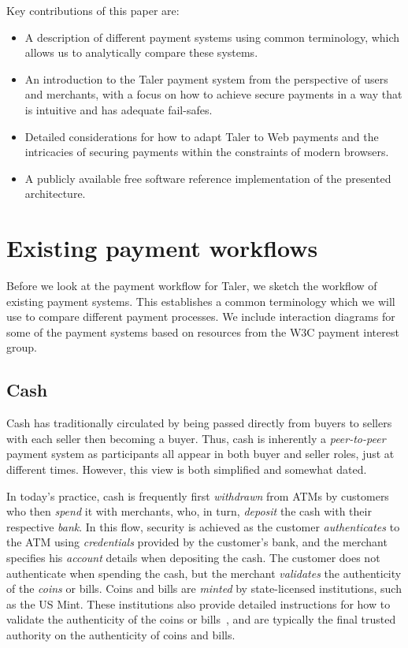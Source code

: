 \documentclass{llncs}
\begin{document}
Key contributions of this paper are:
\begin{itemize}
 \item A description of different payment systems using
  common terminology, which allows us to analytically compare
  these systems.
 \item An introduction to the Taler payment system from the
  perspective of users and merchants, with a focus on how
  to achieve secure payments in a way that is intuitive and
  has adequate fail-safes.
 \item Detailed considerations for how to adapt Taler to
  Web payments and the intricacies of securing payments
  within the constraints of modern browsers.
 \item A publicly available free software
  reference implementation of the presented architecture.
\end{itemize}


\section{Existing payment workflows}

Before we look at the payment workflow for Taler, we sketch the
workflow of existing payment systems. This establishes a common
terminology which we will use to compare different payment processes.
We include interaction diagrams for some of the payment systems
based on resources from the W3C payment interest group.

\subsection{Cash}

Cash has traditionally circulated by being passed directly from buyers
to sellers with each seller then becoming a buyer. Thus, cash is
inherently a {\em peer-to-peer} payment system as participants all
appear in both buyer and seller roles, just at different times.
However, this view is both simplified and
somewhat dated.

In today's practice, cash is frequently first {\em withdrawn} from
ATMs by customers who then {\em spend} it with merchants, who, in turn,
{\em deposit} the cash with their respective {\em bank}.  In this
flow, security is achieved as the customer {\em authenticates} to the
ATM using {\em credentials} provided by the customer's bank, and the
merchant specifies his {\em account} details when depositing the cash.
The customer does not authenticate when spending the cash, but the
merchant {\em validates} the authenticity of the {\em coins} or bills.
Coins and bills are {\em minted} by state-licensed institutions, such
as the US Mint.  These institutions also provide detailed instructions
for how to validate the authenticity of the coins or
bills~\cite{ezb2016ourmoney}, and are typically the final trusted
authority on the authenticity of coins and bills.
\end{document}
